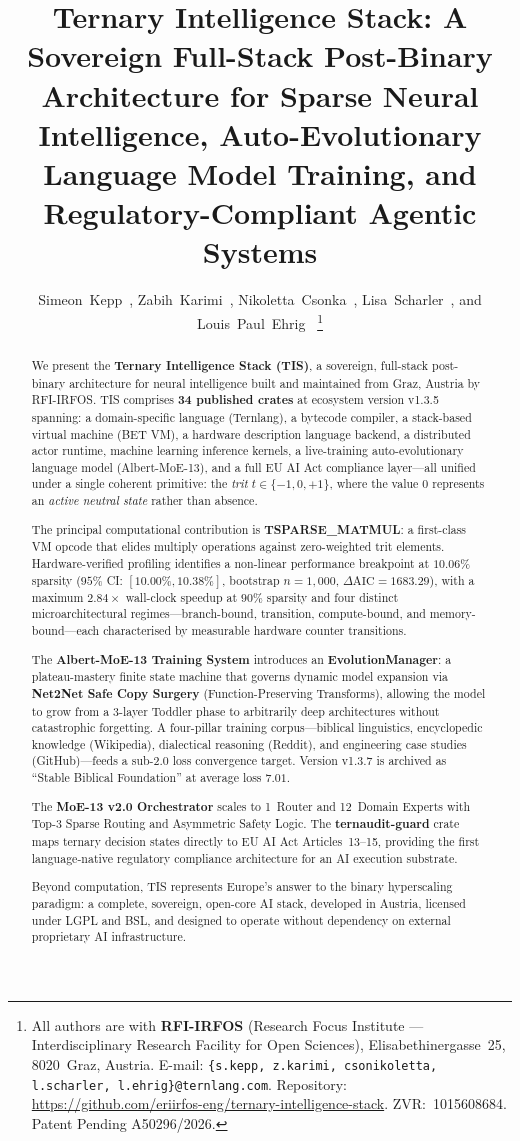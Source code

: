 \documentclass[journal,10pt,twocolumn]{IEEEtran}
\title{Ternary Intelligence Stack: A Sovereign Full-Stack Post-Binary
       Architecture for Sparse Neural Intelligence,
       Auto-Evolutionary Language Model Training, and
       Regulatory-Compliant Agentic Systems}
\author{Simeon~Kepp~\IEEEmembership{(Lead Architect)},\;
        Zabih~Karimi~\IEEEmembership{(ML \& Network Engineering)},\;
        Nikoletta~Csonka~\IEEEmembership{(International Relations)},\;
        Lisa~Scharler~\IEEEmembership{(Social Technology)},\;
        and Louis~Paul~Ehrig~\IEEEmembership{(Public Affairs)}
\thanks{All authors are with \textbf{RFI-IRFOS} (Research Focus Institute ---
Interdisciplinary Research Facility for Open Sciences),
Elisabethinergasse~25, 8020~Graz, Austria.
E-mail: \texttt{\{s.kepp, z.karimi, csonikoletta, l.scharler, l.ehrig\}@ternlang.com}.
Repository: \url{https://github.com/eriirfos-eng/ternary-intelligence-stack}.
ZVR:~1015608684. Patent Pending A50296/2026.}
}
\begin{document}
\maketitle

\begin{abstract}
We present the \textbf{Ternary Intelligence Stack (TIS)}, a sovereign,
full-stack post-binary architecture for neural intelligence built and
maintained from Graz, Austria by RFI-IRFOS. TIS comprises
\textbf{34 published crates} at ecosystem version v1.3.5 spanning: a
domain-specific language (Ternlang), a bytecode compiler, a stack-based
virtual machine (BET VM), a hardware description language backend, a
distributed actor runtime, machine learning inference kernels, a
live-training auto-evolutionary language model (Albert-MoE-13), and a
full EU AI Act compliance layer—all unified under a single coherent
primitive: the \emph{trit} $t \in \{-1, 0, +1\}$, where the value
$0$ represents an \emph{active neutral state} rather than absence.

The principal computational contribution is \textbf{TSPARSE\_MATMUL}: a
first-class VM opcode that elides multiply operations against zero-weighted
trit elements. Hardware-verified profiling identifies a non-linear performance
breakpoint at $10.06\%$ sparsity ($95\%$ CI: $[10.00\%, 10.38\%]$,
bootstrap $n = 1{,}000$, $\Delta\text{AIC} = 1683.29$), with a maximum
$2.84\times$ wall-clock speedup at $90\%$ sparsity and four distinct
microarchitectural regimes---branch-bound, transition, compute-bound, and
memory-bound---each characterised by measurable hardware counter transitions.

The \textbf{Albert-MoE-13 Training System} introduces an
\textbf{EvolutionManager}: a plateau-mastery finite state machine that
governs dynamic model expansion via \textbf{Net2Net Safe Copy Surgery}
(Function-Preserving Transforms), allowing the model to grow from a
3-layer Toddler phase to arbitrarily deep architectures without
catastrophic forgetting. A four-pillar training corpus---biblical
linguistics, encyclopedic knowledge (Wikipedia), dialectical reasoning
(Reddit), and engineering case studies (GitHub)---feeds a sub-2.0 loss
convergence target. Version v1.3.7 is archived as ``Stable Biblical
Foundation'' at average loss $7.01$.

The \textbf{MoE-13 v2.0 Orchestrator} scales to 1~Router and 12~Domain
Experts with Top-3 Sparse Routing and Asymmetric Safety Logic. The
\textbf{ternaudit-guard} crate maps ternary decision states directly
to EU AI Act Articles~13--15, providing the first language-native
regulatory compliance architecture for an AI execution substrate.

Beyond computation, TIS represents Europe's answer to the binary
hyperscaling paradigm: a complete, sovereign, open-core AI stack,
developed in Austria, licensed under LGPL and BSL, and designed to
operate without dependency on external proprietary AI infrastructure.
\end{abstract}
\end{document}

